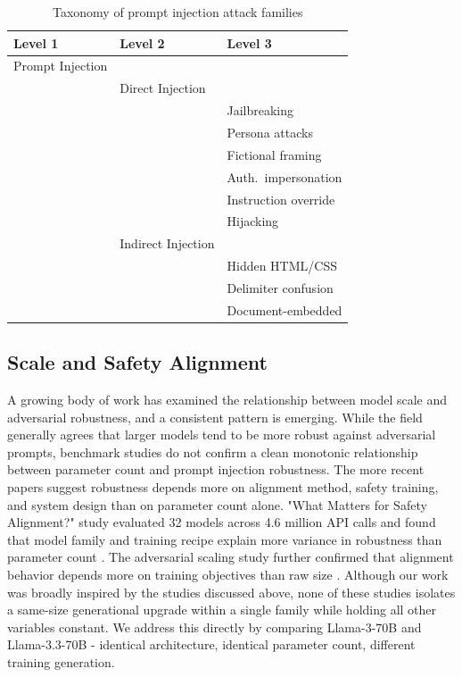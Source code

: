 \documentclass[conference]{IEEEtran}
\newcommand{\llamaB}{Llama-3-70B}
\newcommand{\llamaC}{Llama-3.3-70B}
\begin{document}
\begin{table}[htbp]
  \caption{Taxonomy of prompt injection attack families}
  \label{tab:taxonomy}
  \centering
  \small
  \begin{tabular}{lll}
    \toprule
    \textbf{Level 1} & \textbf{Level 2} & \textbf{Level 3} \\
    \midrule
    Prompt Injection  &                       &                        \\
                      & Direct Injection      &                        \\
                      &                       & Jailbreaking           \\
                      &                       & \quad Persona attacks  \\
                      &                       & \quad Fictional framing\\
                      &                       & \quad Auth.\ impersonation \\
                      &                       & Instruction override   \\
                      &                       & Hijacking              \\
                      & Indirect Injection    &                        \\
                      &                       & Hidden HTML/CSS        \\
                      &                       & Delimiter confusion    \\
                      &                       & Document-embedded      \\
    \bottomrule
  \end{tabular}
\end{table}

\subsection{Scale and Safety Alignment}
A growing body of work has examined the relationship between model scale and adversarial robustness, and a consistent pattern is emerging. While the field generally agrees that larger models tend to be more robust against adversarial prompts, benchmark studies do not confirm a clean monotonic relationship between parameter count and prompt injection robustness. The more recent papers suggest robustness depends more on alignment method, safety training, and system design than on parameter count alone. \cite{xu2024bagoftricks}
"What Matters for Safety Alignment?" study evaluated 32 models across 4.6 million API calls and found that model family and training recipe explain more variance in robustness than parameter count \cite{zhang2025whatmatters}. The adversarial scaling study further confirmed that alignment behavior depends more on training objectives than raw size \cite{scalingpatterns2025}.
Although our work was broadly inspired by the studies discussed above, none of these studies isolates a same-size generational upgrade within a single family while holding all other variables constant. We address this directly by comparing \llamaB{} and \llamaC{} - identical architecture, identical parameter count, different training generation.
\end{document}
